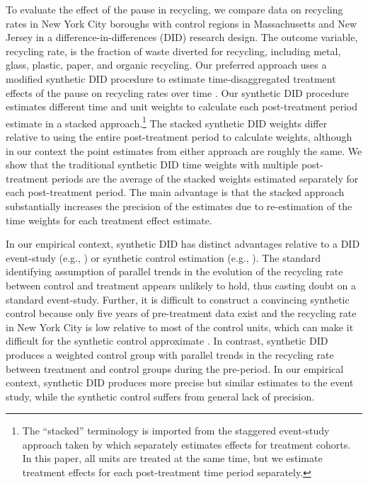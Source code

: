 \documentclass[12pt]{article}
\begin{document}
To evaluate the effect of the pause in recycling, we compare data on recycling rates in New York City boroughs with control regions in Massachusetts and New Jersey in a difference-in-differences (DID) research design.  The outcome variable, recycling rate, is the fraction of waste diverted for recycling, including metal, glass, plastic, paper, and organic recycling.  Our preferred approach uses a modified synthetic DID procedure to estimate time-disaggregated treatment effects of the pause on recycling rates over time \citep{arkhangelsky2021}.  Our synthetic DID procedure estimates different time and unit weights to calculate each post-treatment period estimate in a stacked approach.\footnote{The ``stacked'' terminology is imported from the staggered event-study approach taken by \cite{cengizetal2019} which separately estimates effects for treatment cohorts.  In this paper, all units are treated at the same time, but we estimate treatment effects for each post-treatment time period separately.}  The stacked synthetic DID weights differ relative to using the entire post-treatment period to calculate weights, although in our context the point estimates from either approach are roughly the same.  We show that the traditional synthetic DID time weights with multiple post-treatment periods are the average of the stacked weights estimated separately for each post-treatment period.  The main advantage is that the stacked approach substantially increases the precision of the estimates due to re-estimation of the time weights for each treatment effect estimate.  

In our empirical context, synthetic DID has distinct advantages relative to a DID event-study (e.g., \cite{borusyakjaravel2018}) or synthetic control estimation (e.g., \cite{abadie2021}).  The standard identifying assumption of parallel trends in the evolution of the recycling rate between control and treatment appears unlikely to hold, thus casting doubt on a standard event-study.  Further, it is difficult to construct a convincing synthetic control because only five years of pre-treatment data exist and the recycling rate in New York City is low relative to most of the control units, which can make it difficult for the synthetic control approximate \citep{abadie2021}.  In contrast, synthetic DID produces a weighted control group with parallel trends in the recycling rate between treatment and control groups during the pre-period.  In our empirical context, synthetic DID produces more precise but similar estimates to the event study, while the synthetic control suffers from general lack of precision.
\end{document}
